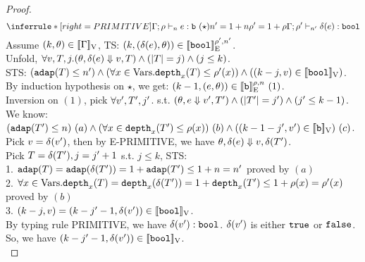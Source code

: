 \documentclass[a4paper,11pt]{article}
\theoremstyle{definition}
\begin{document}
\begin{proof}
\[
    \inferrule*[right = PRIMITIVE]{
      \Gamma; \dmap \tvdash{\nnatA} \expr: \tbase ~ (\star) \\
      \nnatA' = 1 + \nnatA \\
      \dmap' = 1 + \dmap
    }{
      \Gamma; \dmap' \tvdash{\nnatA'} \eop(\expr): \tbool
    }
\]
Assume $(k, \theta) \in [\![ \Gamma ]\!]_{\text{V}}$, TS: $(k, (\delta(e), \theta)) \in [\![ \mathtt{bool} ]\!]_{\text{E}}^{\rho', n'}$.\\
%
Unfold, $\forall v, T, j. (\theta, \delta(e) \mathrel{\Downarrow} v, T) \land (|T| = j) \land (j \leq k)$.\\
%
STS: $(\mathtt{adap}(T) \leq n') \land (\forall x \in \mbox{Vars}. \mathtt{depth}_{x}(T) \leq \rho'(x)) \land ((k - j, v) \in [\![ \mathtt{bool} ]\!]_{\text{V}})$.\\
%
By induction hypothesis on $\star$, we get: $(k-1, (e, \theta)) \in [\![ \mathtt{b} ]\!]_{\text{E}}^{\rho, n} ~ (1)$.\\
%
Inversion on $(1)$, pick $\forall v', T', j'$. s.t. $ (\theta, e \mathrel{\Downarrow} v', T') \land (|T'| = j') \land (j' \leq k-1)$.\\
%
We know: $(\mathtt{adap}(T') \leq n) ~ (a)
\land (\forall x \in \mathtt{depth}_{x}(T') \leq \rho(x)) ~ (b)
\land ((k -1- j', v') \in [\![ \mathtt{b} ]\!]_{\text{V}}) ~ (c)$.\\
%
Pick $v = \delta(v')$, then by E-PRIMITIVE, we have $\theta, \delta(e) \mathrel{\Downarrow} v, \delta(T')$.\\
%
Pick $T = \delta(T'), j = j' + 1$ s.t.  $j \leq k$, STS:\\
%
1. $\mathtt{adap}(T) = \mathtt{adap}(\delta(T')) = 1 + \mathtt{adap}(T') \leq 1 + n = n'$ proved by $(a)$\\
%
2. $\forall x \in \mbox{Vars}. \mathtt{depth}_{x}(T) = \mathtt{depth}_{x}(\delta(T')) = 1 + \mathtt{depth}_{x}(T') \leq 1 + \rho(x) = \rho'(x)$ proved by $(b)$\\
%
3. $(k - j, v) = (k - j' - 1, \delta(v')) \in [\![ \mathtt{bool} ]\!]_{\text{V}} $.\\
%
By typing rule PRIMITIVE, we have $\delta(v'): \mathtt{bool}$. $\delta(v')$ is either $\mathtt{true}$ or $\mathtt{false}$. So, we have $(k - j' - 1, \delta(v')) \in [\![ \mathtt{bool} ]\!]_{\text{V}}$.\\
%




\end{proof}
\end{document}

